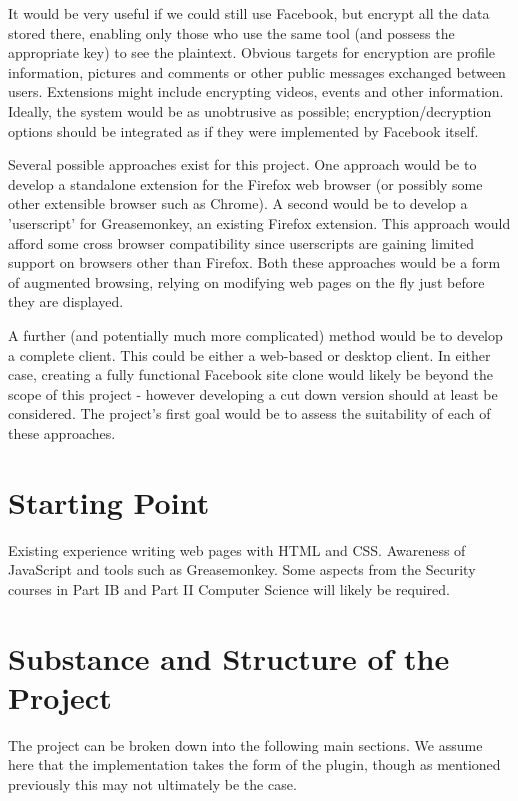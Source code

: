 \documentclass[12pt]{article}
\begin{document}
It would be very useful if we could still use Facebook, but encrypt all the data stored there, enabling only those who use the same tool (and possess the appropriate key) to see the plaintext. Obvious targets for encryption are profile information, pictures and comments or other public messages exchanged between users. Extensions might include encrypting videos, events and other information. Ideally, the system would be as unobtrusive as possible; encryption/decryption options should be integrated as if they were implemented by Facebook itself.

Several possible approaches exist for this project. One approach would be to develop a standalone extension for the Firefox web browser (or possibly some other extensible browser such as Chrome). A second would be to develop a 'userscript' for Greasemonkey, an existing Firefox extension. This approach would afford some cross browser compatibility since userscripts are gaining limited support on browsers other than Firefox. Both these approaches would be a form of augmented browsing, relying on modifying web pages on the fly just before they are displayed.

A further (and potentially much more complicated) method would be to develop a complete client. This could be either a web-based or desktop client. In either case, creating a fully functional Facebook site clone would likely be beyond the scope of this project - however developing a cut down version should at least be considered. The project's first goal would be to assess the suitability of each of these approaches.



\section*{Starting Point}

Existing experience writing web pages with HTML and CSS. Awareness of JavaScript and tools such as Greasemonkey. Some aspects from the Security courses in Part IB and Part II Computer Science will likely be required.


\section*{Substance and Structure of the Project}


The project can be broken down into the following main sections. We assume here that the implementation takes the form of the plugin, though as mentioned previously this may not ultimately be the case.
\end{document}
